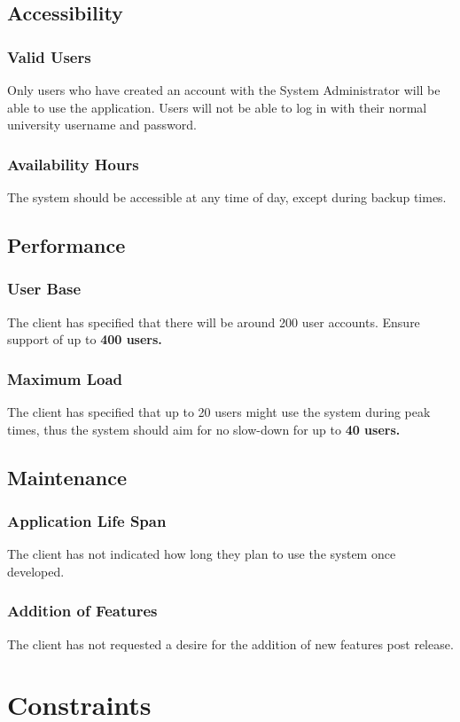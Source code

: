 \documentclass{article}
\begin{document}
\subsection{Accessibility}
\subsubsection{Valid Users}
Only users who have created an account with the System Administrator will be able
to use the application. Users will not be able to log in with their normal
university username and password.
\subsubsection{Availability Hours}
The system should be accessible at any time of day, except during backup times.
\subsection{Performance}
\subsubsection{User Base}
The client has specified that there will be around 200 user accounts. Ensure
support of up to \textbf{400 users.}
\subsubsection{Maximum Load}
The client has specified that up to 20 users might use the system during
peak times, thus the system should aim for no slow-down for up to \textbf{40 users.}
\subsection{Maintenance}
\subsubsection{Application Life Span}
The client has not indicated how long they plan to use the system once developed.
\subsubsection{Addition of Features}
The client has not requested a desire for the addition of new
features post release.

\section{Constraints}
\end{document}
